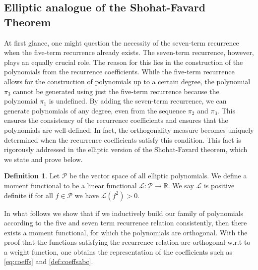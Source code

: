 \documentclass[11pt,a4paper]{article}
\theoremstyle{definition}
\newtheorem{definition}[theorem]{Definition}
\numberwithin{equation}{section}
\numberwithin{theorem}{section}
\begin{document}
\subsection{Elliptic analogue of the Shohat-Favard Theorem}\label{subsec:ShohatFavard}
At first glance, one might question the necessity of the seven-term recurrence when the five-term recurrence already exists. The seven-term recurrence, however, plays an equally crucial role. The reason for this lies in the construction of the polynomials from the recurrence coefficients. While the five-term recurrence allows for the construction of polynomials up to a certain degree, the polynomial \( \pi_3 \) cannot be generated using just the five-term recurrence because the polynomial \( \pi_1 \) is undefined. By adding the seven-term recurrence, we can generate polynomials of any degree, even from the sequence \( \pi_2 \) and \( \pi_3 \). This ensures the consistency of the recurrence coefficients and ensures that the polynomials are well-defined. In fact, the orthogonality measure becomes uniquely determined when the recurrence coefficients satisfy this condition. This fact is rigorously addressed in the elliptic version of the Shohat-Favard theorem, which we state and prove below.
\begin{definition}
    Let $\mathcal{P}$ be the vector space of all elliptic polynomials. We define a moment functional to be a linear functional $\mathcal{L}:\mathcal{P}\rightarrow\mathbb R$. We say $\mathcal{L}$ is positive definite if for all $f\in \mathcal{P}$ we have $\mathcal{L}(f^2)>0$.
\end{definition}
{In what follows we show that if we inductively build our family of polynomials according to the five and seven term recurrence relation consistently, then there exists a moment functional, for which the polynomials are orthogonal.
With the proof that the functions satisfying the recurrence relation are orthogonal w.r.t to a weight function, one obtains the representation of the coefficients such as \eqref{eq:coeffs} and \eqref{def:coeffsabc}.}
\end{document}
